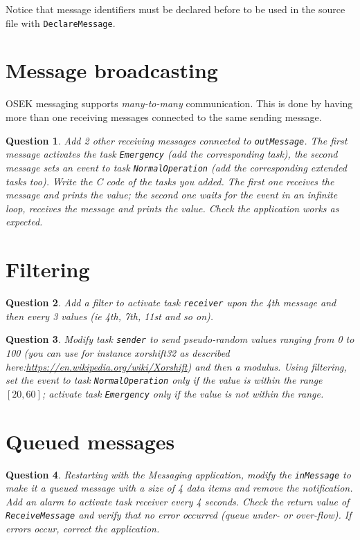 \documentclass[11pt]{report}
\newtheorem{ex}{Question}
\begin{document}
Notice that message identifiers must be declared before to be used in the source file with \texttt{DeclareMessage}.

\section{Message broadcasting}

OSEK messaging supports \emph{many-to-many} communication. This is done by having more than one receiving messages connected to the same sending message.
\begin{ex}
Add 2 other receiving messages connected to \texttt{outMessage}. The first message activates the task \texttt{Emergency} (add the corresponding task), the second message sets an event to task \texttt{NormalOperation} (add the corresponding extended tasks too). Write the C code of the tasks you added. The first one receives the message and prints the value; the second one waits for the event in an infinite loop, receives the message and prints the value. Check the application works as expected.
\end{ex}

\section{Filtering}

\begin{ex}
Add a filter to activate task \texttt{receiver} upon the 4th message and then every 3 values (ie 4th, 7th, 11st and so on).
\end{ex}

\begin{ex}
    Modify task \texttt{sender} to send  pseudo-random values ranging from 0 to 100 (you can use for instance xorshift32 as described here:\url{https://en.wikipedia.org/wiki/Xorshift}) and then a modulus.
    Using filtering, set the event to task \texttt{NormalOperation} only if the value is within the range $[20,60]$; activate task \texttt{Emergency} only if the value is not within the range.
\end{ex}

\section{Queued messages}


\begin{ex}
    Restarting with the Messaging application, modify the \texttt{inMessage} to make it a queued message with a size of 4 data items and remove the notification. Add an alarm to activate task receiver every 4 seconds. Check the return value of \texttt{ReceiveMessage} and verify that no error occurred (queue under- or over-flow). If errors occur, correct the application.
\end{ex}
\end{document}
